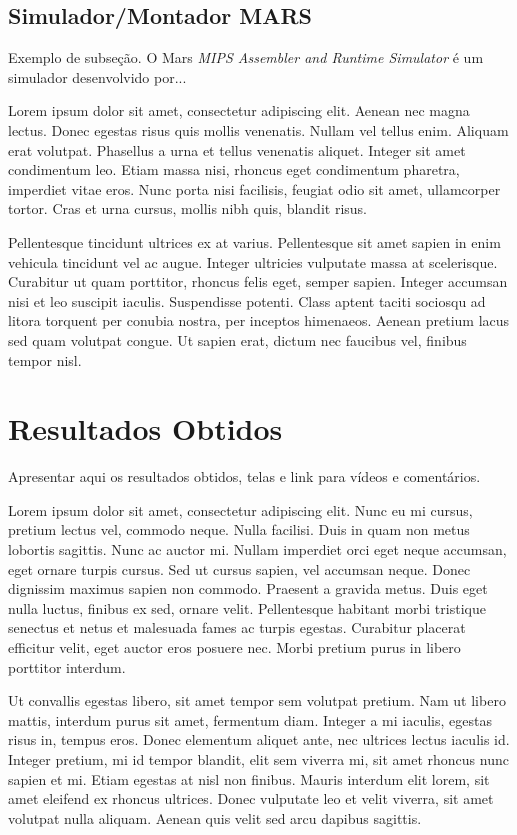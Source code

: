 \documentclass[a4paper]{sbgames}
\begin{document}
\subsection{Simulador/Montador MARS}{
\label{sec:Mars}
Exemplo de subseção. O Mars \textit{MIPS Assembler and Runtime Simulator} \cite{Mars1} é um simulador desenvolvido por...

Lorem ipsum dolor sit amet, consectetur adipiscing elit. Aenean nec magna lectus. Donec egestas risus quis mollis venenatis. Nullam vel tellus enim. Aliquam erat volutpat. Phasellus a urna et tellus venenatis aliquet. Integer sit amet condimentum leo. Etiam massa nisi, rhoncus eget condimentum pharetra, imperdiet vitae eros. Nunc porta nisi facilisis, feugiat odio sit amet, ullamcorper tortor. Cras et urna cursus, mollis nibh quis, blandit risus.

Pellentesque tincidunt ultrices ex at varius. Pellentesque sit amet sapien in enim vehicula tincidunt vel ac augue. Integer ultricies vulputate massa at scelerisque. Curabitur ut quam porttitor, rhoncus felis eget, semper sapien. Integer accumsan nisi et leo suscipit iaculis. Suspendisse potenti. Class aptent taciti sociosqu ad litora torquent per conubia nostra, per inceptos himenaeos. Aenean pretium lacus sed quam volutpat congue. Ut sapien erat, dictum nec faucibus vel, finibus tempor nisl. 
}


\section{Resultados Obtidos}
\label{sec:Resultados}
Apresentar aqui os resultados obtidos, telas e link para vídeos e comentários.



Lorem ipsum dolor sit amet, consectetur adipiscing elit. Nunc eu mi cursus, pretium lectus vel, commodo neque. Nulla facilisi. Duis in quam non metus lobortis sagittis. Nunc ac auctor mi. Nullam imperdiet orci eget neque accumsan, eget ornare turpis cursus. Sed ut cursus sapien, vel accumsan neque. Donec dignissim maximus sapien non commodo. Praesent a gravida metus. Duis eget nulla luctus, finibus ex sed, ornare velit. Pellentesque habitant morbi tristique senectus et netus et malesuada fames ac turpis egestas. Curabitur placerat efficitur velit, eget auctor eros posuere nec. Morbi pretium purus in libero porttitor interdum.

Ut convallis egestas libero, sit amet tempor sem volutpat pretium. Nam ut libero mattis, interdum purus sit amet, fermentum diam. Integer a mi iaculis, egestas risus in, tempus eros. Donec elementum aliquet ante, nec ultrices lectus iaculis id. Integer pretium, mi id tempor blandit, elit sem viverra mi, sit amet rhoncus nunc sapien et mi. Etiam egestas at nisl non finibus. Mauris interdum elit lorem, sit amet eleifend ex rhoncus ultrices. Donec vulputate leo et velit viverra, sit amet volutpat nulla aliquam. Aenean quis velit sed arcu dapibus sagittis.
\end{document}
